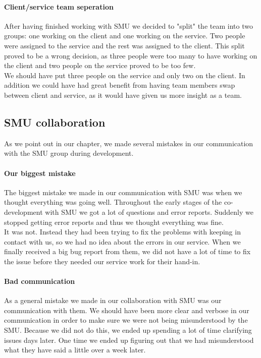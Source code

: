 \paragraph{Client/service team seperation} After having finished working with SMU we decided to "split" the team into two groups: one working on the client and one working on the service. Two people were assigned to the service and the rest was assigned to the client. This split proved to be a wrong decision, as three people were too many to have working on the client and two people on the service proved to be too few.
\\We should have put three people on the service and only two on the client. In addition we could have had great benefit from having team members swap between client and service, as it would have given us more insight as a team.

\subsection{SMU collaboration}
As we point out in our  chapter, we made several mistakes in our communication with the SMU group during development.

\paragraph{Our biggest mistake} The biggest mistake we made in our communication with SMU was when we thought everything was going well. Throughout the early stages of the co-development with SMU we got a lot of questions and error reports. Suddenly we stopped getting error reports and thus we thought everything was fine.
\\It was not. Instead they had been trying to fix the problems with keeping in contact with us, so we had no idea about the errors in our service. When we finally received a big bug report from them, we did not have a lot of time to fix the issue before they needed our service work for their hand-in.

\paragraph{Bad communication} As a general mistake we made in our collaboration with SMU was our communication with them. We should have been more clear and verbose in our communication in order to make sure we were not being misunderstood by the SMU. Because we did not do this, we ended up spending a lot of time clarifying issues days later. One time we ended up figuring out that we had misunderstood what they have said a little over a week later.


